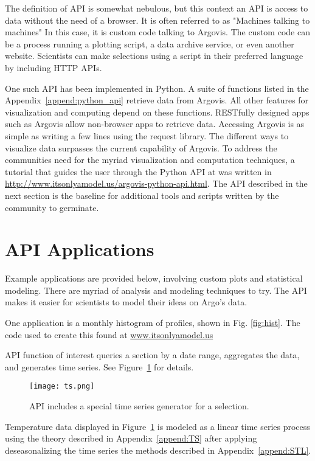 The definition of API is somewhat nebulous, but this context an API is access to data without the need of a browser. It is often referred to as "Machines talking to machines" In this case, it is custom code talking to Argovis. The custom code can be a process running a plotting script, a data archive service, or even another website. Scientists can make selections using a script in their preferred language by including HTTP APIs.

One such API has been implemented in Python. A suite of functions listed in the Appendix~\ref{append:python_api} retrieve data from Argovis. All other features for visualization and computing depend on these functions. RESTfully designed apps such as Argovis allow non-browser apps to retrieve data. Accessing Argovis is as simple as writing a few lines using the request library. The different ways to visualize data surpasses the current capability of Argovis. To address the communities need for the myriad visualization and computation techniques, a tutorial that guides the user through the Python API at was written in \url{http://www.itsonlyamodel.us/argovis-python-api.html}. The API described in the next section is the baseline for additional tools and scripts written by the community to germinate.

\section{API Applications}
Example applications are provided below, involving custom plots and statistical modeling. There are myriad of analysis and modeling techniques to try. The API makes it easier for scientists to model their ideas on Argo's data.

One application is a monthly histogram of profiles, shown in Fig. \ref{fig:hist}. The code used to create this found at \url{www.itsonlyamodel.us}

API function of interest queries a section by a date range, aggregates the data, and generates time series. See Figure~\ref{fig:ts} for details.

\begin{figure}[H]
\centering
\begin{minipage}{6in}
\texttt{[image: ts.png]}
\caption{\label{fig:ts}API includes a special time series generator for a selection.}
\end{minipage}
\end{figure}

Temperature data displayed in Figure~\ref{fig:ts} is modeled as a linear time series process using the theory described in Appendix~\ref{append:TS} after applying deseasonalizing the time series the methods described in Appendix~\ref{append:STL}.

